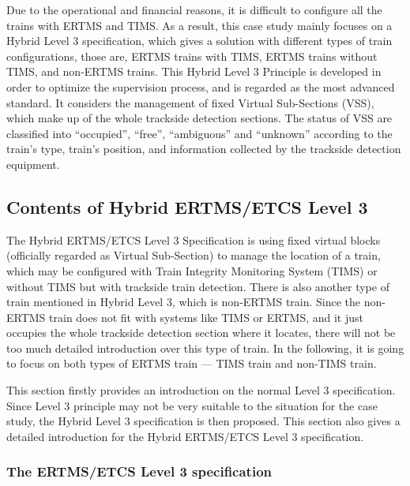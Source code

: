 \documentclass[article,dr=phil,type=drfinal,colorback,accentcolor=tud9c]{tudthesis}
\begin{document}
  Due to the operational and financial reasons, it is difficult to configure all the trains with ERTMS and TIMS. As a result, this case study mainly focuses on a Hybrid Level 3 specification, which gives a solution with different types of train configurations, those are, ERTMS trains with TIMS, ERTMS trains without TIMS, and non-ERTMS trains. This Hybrid Level 3 Principle is developed in order to optimize the supervision process, and is regarded as the most advanced standard. It considers the management of fixed Virtual Sub-Sections (VSS), which make up of the whole trackside detection sections. The status of VSS are classified into ``occupied'', ``free'', ``ambiguous'' and ``unknown'' according to the train's type, train's position, and information collected by the trackside detection equipment.  
    
  \subsection{Contents of Hybrid ERTMS/ETCS Level 3}
  
  The Hybrid ERTMS/ETCS Level 3 Specification is using fixed virtual blocks (officially regarded as Virtual Sub-Section) to manage the location of a train, which may be configured with Train Integrity Monitoring System (TIMS) or without TIMS but with trackside train detection. There is also another type of train mentioned in Hybrid Level 3, which is non-ERTMS train. Since the non-ERTMS train does not fit with systems like TIMS or ERTMS, and it just occupies the whole trackside detection section where it locates, there will not be too much detailed introduction over this type of train. In the following, it is going to focus on both types of ERTMS train --- TIMS train and non-TIMS train.
  
  This section firstly provides an introduction on the normal Level 3 specification. Since Level 3 principle may not be very suitable to the situation for the case study, the Hybrid Level 3 specification is then proposed. This section also gives a detailed introduction for the Hybrid ERTMS/ETCS Level 3 specification.
  
  \subsubsection{The ERTMS/ETCS Level 3 specification} 
  
\end{document}

